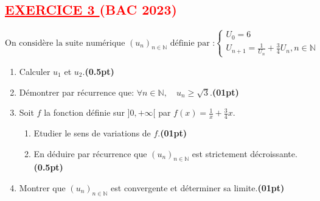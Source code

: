 \documentclass[12pt,a4paper]{article}
\begin{document}
\subsection*{\textcolor{red}{\underline{EXERCICE 3 } (BAC 2023) }}
\[
\text{On considère la suite numérique } (u_n)_{n \in \mathbb{N}} \text{ définie par :}
\begin{cases}
U_{0}=6\\
U_{n+1}=\frac{1}{U_{n}}+\frac{3}{4}U_{n}, n\in\mathbb{N}
\end{cases}
\]
\begin{enumerate}
\item[1)] Calculer \( u_1 \) et \( u_2 \).\hfill\textbf{(0.5pt)}

\item[2)] Démontrer par récurrence que: \( \forall n\in\mathbb{N},\quad u_n \geq \sqrt{3} \).\hfill\textbf{(01pt)}

\item[3)] Soit $f$ la fonction définie sur $]0, +\infty[$ par \( f(x) = \frac{1}{x} + \frac{3}{4}x \).
\begin{enumerate}
\item[a)] Etudier le sens de variations de $f$.\hfill\textbf{(01pt)}
\item[b)] En déduire par récurrence que $(u_n)_{n \in \mathbb{N}}$ est strictement décroissante.\hfill\textbf{(0.5pt)}
\end{enumerate}

\item[4)] Montrer que $(u_n)_{n \in \mathbb{N}}$ est convergente et déterminer sa limite.\hfill\textbf{(01pt)}

\end{enumerate}
\end{document}
